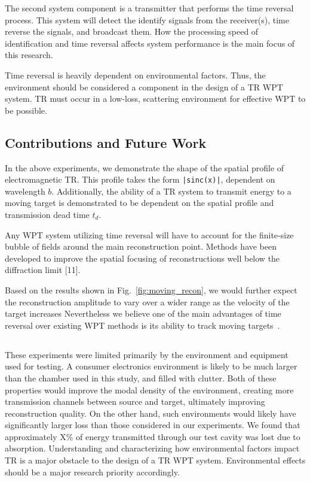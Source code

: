 The second system component is a transmitter that performs the time reversal process.  This system will detect the identify signals from the receiver(s), time reverse the signals, and broadcast them.   How the processing speed of identification and time reversal affects system performance is the main focus of this research.

Time reversal is heavily dependent on environmental factors.  Thus, the environment should be considered a component in the design of a TR WPT system.  TR must occur in a low-loss, scattering environment for effective WPT to be possible.

\subsection{Contributions and Future Work}
\label{sec:Contrib}

In the above experiments, we demonstrate the shape of the spatial profile of electromagnetic
TR. This profile takes the form \texttt{|sinc(x)|}, dependent on wavelength $b$.
Additionally, the ability of a TR system to transmit energy to a moving target is 
demonstrated to be dependent on the spatial profile and transmission dead 
time $t_{d}$.

Any WPT system utilizing time reversal will have to account for the 
finite-size bubble of fields around  the  main  reconstruction  point.
Methods  have  been developed  to  improve  the  spatial  focusing  of  reconstructions
well below the diffraction limit [11]. 

Based on the results shown in Fig.~\ref{fig:moving_recon}, we would further
expect the reconstruction amplitude to vary over a wider range as the velocity
of the target increases
%
Nevertheless we believe one of the main advantages of time reversal over
existing WPT methods is its ability to track moving
targets~\cite{fink,nltr-wave-chaotic}.


\subsection{}
\label{sec:limitations}


These experiments were limited primarily by the environment and equipment used
for testing.
%
A consumer electronics environment is likely to be much larger than the chamber
used in this study, and filled with clutter.
%
Both of these properties would improve the modal density of the environment,
creating more transmission channels between source and target, ultimately
improving reconstruction quality.
%
On the other hand, such environments would likely have significantly larger loss
than those considered in our experiments. We found that approximately X\% of energy  transmitted through our test cavity was lost due to absorption. Understanding and characterizing how environmental factors impact TR is a major obstacle to the design of a TR WPT system. Environmental effects should be a major research priority accordingly.

